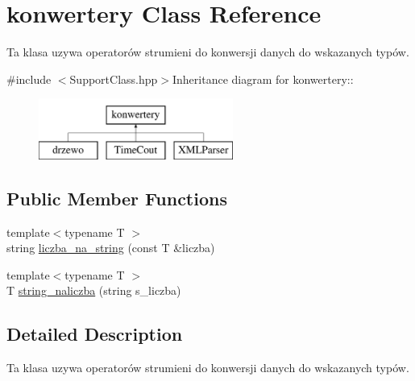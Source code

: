\hypertarget{classkonwertery}{
\section{konwertery Class Reference}
\label{classkonwertery}
}


Ta klasa uzywa operatorów strumieni do konwersji danych do wskazanych typów.  


{\ttfamily \#include $<$SupportClass.hpp$>$}Inheritance diagram for konwertery::\begin{figure}[H]
\begin{center}
\leavevmode
\includegraphics[height=2cm]{classkonwertery}
\end{center}
\end{figure}
\subsection*{Public Member Functions}
\begin{DoxyCompactItemize}
\item 
{\footnotesize template$<$typename T $>$ }\\string \hyperlink{classkonwertery_a441339a6d2152a4201334294be9f3abf}{liczba\_\-na\_\-string} (const T \&liczba)
\item 
{\footnotesize template$<$typename T $>$ }\\T \hyperlink{classkonwertery_aa69477809e88f575b1f257125731d496}{string\_\-naliczba} (string s\_\-liczba)
\end{DoxyCompactItemize}


\subsection{Detailed Description}
Ta klasa uzywa operatorów strumieni do konwersji danych do wskazanych typów. 

